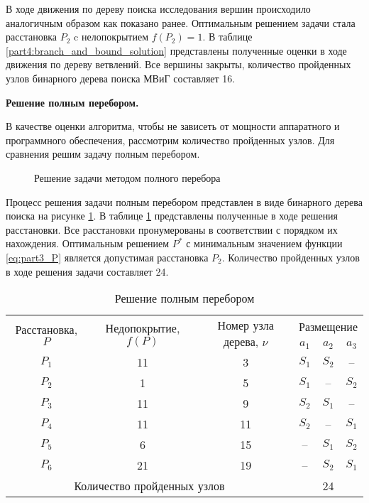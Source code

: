 В ходе движения по дереву поиска исследования вершин происходило аналогичным образом как показано ранее. Оптимальным решением задачи стала расстановка $P_2$ c нелопокрытием $f(P_2) = 1$. В таблице \cref{part4:branch_and_bound_solution} представлены полученные оценки в ходе движения по дереву ветвлений.  Все вершины закрыты, количество пройденных узлов бинарного дерева поиска МВиГ составляет 16.


\textbf{Решение полным перебором.}

В качестве оценки алгоритма, чтобы не зависеть от мощности аппаратного и программного обеспечения, рассмотрим количество пройденных узлов. Для сравнения решим задачу полным перебором.

\begin{figure}[ht]
  \caption{Решение задачи методом полного перебора}\label{fig:part2_brute_force_tree}
\end{figure}

Процесс решения задачи полным перебором представлен в виде бинарного дерева поиска на рисунке \cref{fig:part2_brute_force_tree}. В таблице \cref{part4:brute_force_solution} представлены полученные в ходе решения расстановки. Все расстановки пронумерованы в соответствии с порядком их нахождения. Оптимальным решением $P^*$ с минимальным значением функции \cref{eq:part3_P} является допустимая расстановка $P_2$. Количество пройденных узлов в ходе решения задачи составляет 24.

\begin{table}[h!]\centering
  \begin{tabular}{| c | c | c | c  c c|}
    \hline
    \multirow{2}{*}{Расстановка, $P$} & \multirow{2}{*}{Недопокрытие, $f(P)$} & \multirow{2}{*}{Номер узла дерева, $\nu$} &  \multicolumn{3}{c|}{Размещение} \\\cline{4-6}

    &&& $a_1$&	$a_2$&	$a_3$\\
    \hline
    $P_1$ & 11 & 3 & $S_1$ & $S_2$ & -- \\
    $P_2$ & 1 & 5 & $S_1$ & -- & $S_2$ \\
    $P_3$ & 11 & 9 & $S_2$ & $S_1$ & --  \\
    $P_4$ & 11 & 11 & $S_2$ & -- & $S_1$ \\
    $P_5$ & 6 & 15 & -- & $S_1$  & $S_2$\\
    $P_6$ & 21 & 19 & -- & $S_2$  & $S_1$\\
    \hline
    \multicolumn{3}{|c|}{Количество пройденных узлов} & \multicolumn{3}{|c|}{24} \\

    \hline
  \end{tabular}\caption{Решение полным перебором}\label{part4:brute_force_solution}
\end{table}

